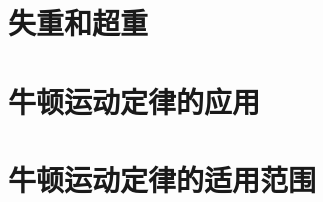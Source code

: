\documentclass[color=purple,openany]{textbook-cn}
\begin{document}
\begin{Case}
\item \lipsum[1][3]
\item \lipsum[1][3]
\item \lipsum[1][3]
\item \lipsum[1][3]
\end{Case}

\begin{Link}
\zhlipsum[1]
\end{Link}




\section{失重和超重}

\begin{Point}
\lipsum[2]
\end{Point}

\begin{Case}
\item \lipsum[1][3]
\item \lipsum[1][3]
\item \lipsum[1][3]
\item \lipsum[1][3]
\end{Case}

\begin{Link}
\zhlipsum[1]
\end{Link}






\section{牛顿运动定律的应用}
\begin{Point}
\lipsum[2]
\end{Point}

\begin{Case}
\item \lipsum[1][3]
\item \lipsum[1][3]
\item \lipsum[1][3]
\item \lipsum[1][3]
\end{Case}

\begin{Link}
\zhlipsum[1]
\end{Link}





\section{牛顿运动定律的适用范围}
\begin{Point}
\lipsum[2]
\end{Point}
\end{document}
